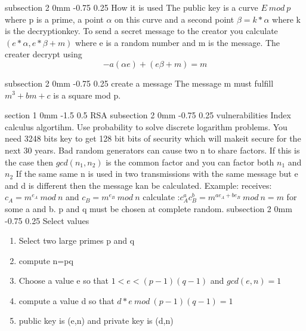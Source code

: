 \documentclass[a4paper,11pt]{article}
\makeatletter
\renewcommand{\section}{\@startsection
   {section}%
   {1}%
   {0mm}%
   {-1.5\baselineskip}%
   {0.5\baselineskip}%
   {\sffamily\bfseries\upshape\normalsize}}%
\renewcommand{\subsection}{\@startsection
   {subsection}%
   {2}%
   {0mm}%
   {-0.75\baselineskip}%
   {0.25\baselineskip}%
   {\rmfamily\normalfont\slshape\normalsize}}%
\makeatother
\begin{document}
\subsection{How it is used}
The public key is a curve $E \ mod \ p$ where p is a prime, a point $\alpha$ on this curve and a second point $\beta=k*\alpha$ where k is the decryptionkey. To send a secret message to the creator you calculate $(e*\alpha,e*\beta+m)$ where e is a random number and m is the message. The creater decrypt using $$-a(\alpha e)+(e\beta+m)=m$$

\subsection{create a message}
The message m must fulfill $m^3+bm+c$ is a square mod p.

\section{RSA}
\subsection{vulnerabilities}
Index calculus algortihm. Use probability to solve discrete logarithm problems. You need 3248 bits key to get 128 bit bits of security which will makeit secure for the next 30 years.	
\newline
\newline
Bad random generators can cause two n to share factors. If this is the case then $gcd(n_1,n_2)$ is the common factor and you can factor both $n_1$ and $n_2$
\newline
\newline
If the same same n is used in two transmissions with the same message but e and d is different then the message kan be calculated. Example:
receives: $ c_A=m^{e_A} \ mod \ n $ and $c_B=m^{e_B} \ mod \ n$ calculate :$c_A^ac_B^b=m^{ae_A+be_B} \ mod \ n=m$ for some a and b.
\newline
\newline
p and q must be chosen at complete random.
\subsection{Select values}
\begin{enumerate}
\item Select two large primes p and q
\item compute n=pq
\item Choose a value e so that $1<e<(p-1)(q-1)$ and $gcd(e,n)=1$
\item compute a value d so that $d*e \ mod \ (p-1)(q-1)=1  $
\item public key is (e,n) and private key is (d,n)
\end{enumerate}
\end{document}
